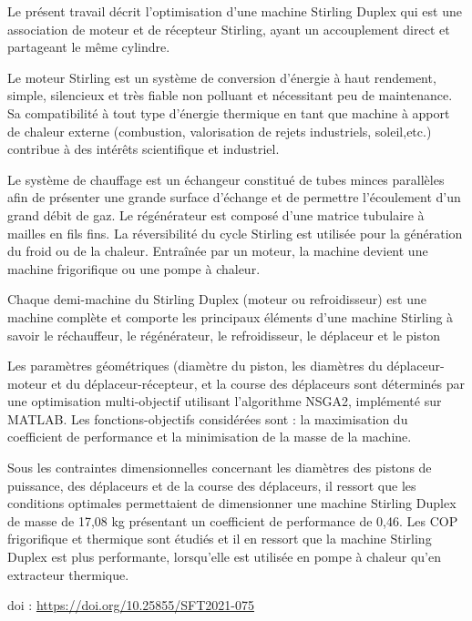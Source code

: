 {\normalsize
Le présent travail décrit l'optimisation d'une machine Stirling Duplex qui est une association de moteur et de récepteur Stirling, ayant un accouplement direct et partageant le même cylindre.



Le moteur Stirling est un système de conversion d'énergie à haut rendement, simple, silencieux et très fiable non polluant et nécessitant peu de maintenance. Sa compatibilité à tout type d'énergie thermique en tant que machine à apport de chaleur externe (combustion, valorisation de rejets industriels, soleil,etc.) contribue à des intérêts scientifique et industriel.



Le système de chauffage est un échangeur constitué de tubes minces parallèles afin de présenter une grande surface d'échange et de permettre l'écoulement d'un grand débit de gaz. Le régénérateur est composé d'une matrice tubulaire à mailles en fils fins. La réversibilité du cycle Stirling est utilisée pour la génération du froid ou de la chaleur. Entraînée par un moteur, la machine devient une machine frigorifique ou une pompe à chaleur.



Chaque demi-machine du Stirling Duplex (moteur ou refroidisseur) est une machine complète et comporte les principaux éléments d'une machine Stirling à savoir le réchauffeur, le régénérateur, le refroidisseur, le déplaceur et le piston



Les paramètres géométriques (diamètre du piston, les diamètres du déplaceur-moteur et du déplaceur-récepteur, et la course des déplaceurs sont déterminés par une optimisation multi-objectif utilisant l'algorithme NSGA2, implémenté sur MATLAB. Les fonctions-objectifs considérées sont : la maximisation du coefficient de performance et la minimisation de la masse de la machine.



Sous les contraintes dimensionnelles concernant les diamètres des pistons de puissance, des déplaceurs et de la course des déplaceurs, il ressort que les conditions optimales permettaient de dimensionner une machine Stirling Duplex de masse  de 17,08 kg présentant un coefficient de performance de 0,46. Les COP frigorifique et thermique sont étudiés et il en ressort que la machine Stirling Duplex est plus performante, lorsqu'elle est utilisée en pompe à chaleur qu'en extracteur thermique.

 \vfill doi : \url{https://doi.org/10.25855/SFT2021-075}

}
 

